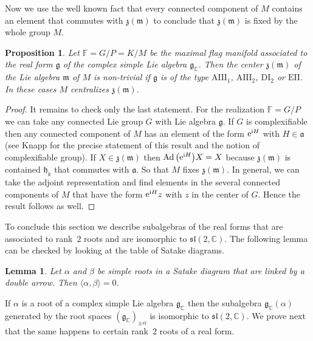 \documentclass[10pt,a4paper]{amsart}
\numberwithin{equation}{section}
\newtheorem{Lemma}[Theorem]{Lemma}
\newtheorem{Proposition}[Theorem]{Proposition}
 { \theoremstyle{definition}
\newtheorem{Definition}[Theorem]{Definition}
\newtheorem{Note}[Theorem]{Note}
\newtheorem{Example}[Theorem]{Example}
\newtheorem{Remark}[Theorem]{Remark} }
\begin{document}
Now we use the well known fact that every connected component of $M$ contains an element that commutes with $\mathfrak{z} ( \mathfrak{m} ) $ to conclude that $\mathfrak{z}(\mathfrak{m}) $ is fixed by the whole group $M$.

\begin{Proposition}Let $\mathbb{F}=G/P=K/M$ be the maximal flag manifold associated to the real form $\mathfrak{g}$ of the complex simple Lie algebra $\mathfrak{g}_{\mathbb{C}}$. Then the center $\mathfrak{z}(\mathfrak{m}) $ of the Lie algebra $\mathfrak{m}$ of $M$ is non-trivial if $\mathfrak{g}$ is of the type $\mathrm{AIII}_{1}$, $\mathrm{AIII}_{2}$, $\mathrm{DI}_{2}$ or $\mathrm{EII}$. In these cases $M$ centralizes $\mathfrak{z}(\mathfrak{m}) $.
\end{Proposition}

\begin{proof}It remains to check only the last statement. For the realization $\mathbb{F}=G/P$ we can take any connected Lie group $G$ with Lie algebra $\mathfrak{g}$. If $G$ is complexifiable then any connected component of $M$ has an element of the form ${\rm e}^{{\rm i}H}$ with $H\in \mathfrak{a}$ (see Knapp \cite[Section~VII.5]{knapp} for the precise statement of this result and the notion of complexifiable group). If $X\in \mathfrak{z}(\mathfrak{m}) $ then $\operatorname{Ad} \big({\rm e}^{{\rm i}H} \big) X=X$ because $\mathfrak{z} (\mathfrak{m} ) $ is contained $\mathfrak{h}_{k}$ that commutes with $\mathfrak{a}$. So that $M$ fixes $\mathfrak{z}(\mathfrak{m}) $. In general, we can take the adjoint representation and find elements in the several connected components of $M$ that have the form ${\rm e}^{{\rm i}H}z$ with $z$ in the center of $G$. Hence the result follows as well.
\end{proof}

To conclude this section we describe subalgebras of the real forms that are associated to rank~$2$ roots and are isomorphic to $\mathfrak{sl}(2,\mathbb{C} ) $. The following lemma can be checked by looking at the
table of Satake diagrams.

\begin{Lemma}Let $\alpha $ and $\beta $ be simple roots in a Satake diagram that are linked by a double arrow. Then $\langle \alpha,\beta \rangle =0$.
\end{Lemma}

If $\mathbb{\alpha }$ is a root of a complex simple Lie algebra $\mathfrak{g}_{\mathbb{C}}$ then the subalgebra $\mathfrak{g}_{\mathbb{C}} (\alpha) $ generated by the root spaces $( \mathfrak{g}_{\mathbb{C}}) _{\pm \alpha }$ is isomorphic to $\mathfrak{sl}( 2,\mathbb{C}) $. We prove next that the same happens to certain rank~$2$ roots of a real form.
\end{document}
